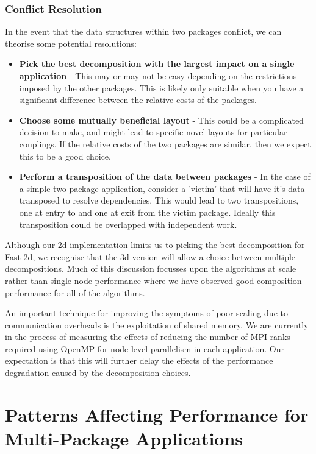 \documentclass[runningheads,a4paper]{llncs}
\begin{document}
\subsubsection{Conflict Resolution}

In the event that the data structures within two packages conflict, we can theorise some potential resolutions:

\begin{itemize}
  \item \textbf{Pick the best decomposition with the largest impact on a single application} - This may or may not be easy depending on the restrictions imposed by the other packages. This is likely only suitable when you have a significant difference between the relative costs of the packages.
  \item \textbf{Choose some mutually beneficial layout} - This could be a complicated decision to make, and might lead to specific novel layouts for particular couplings. If the relative costs of the two packages are similar, then we expect this to be a good choice.
  \item \textbf{Perform a transposition of the data between packages} - In the case of a simple two package application, consider a 'victim' that will have it's data transposed to resolve dependencies. This would lead to two transpositions, one at entry to and one at exit from the victim package. Ideally this transposition could be overlapped with independent work.
\end{itemize}

Although our 2d implementation limits us to picking the best decomposition for Fast 2d, we recognise that the 3d version will allow a choice between multiple decompositions. Much of this discussion focusses upon the algorithms at scale rather than single node performance where we have observed good composition performance for all of the algorithms. 

An important technique for improving the symptoms of poor scaling due to communication overheads is the exploitation of shared memory. We are currently in the process of measuring the effects of reducing the number of MPI ranks required using OpenMP for node-level parallelism in each application. Our expectation is that this will further delay the effects of the performance degradation caused by the decomposition choices.

\section{Patterns Affecting Performance for Multi-Package Applications}
\end{document}
